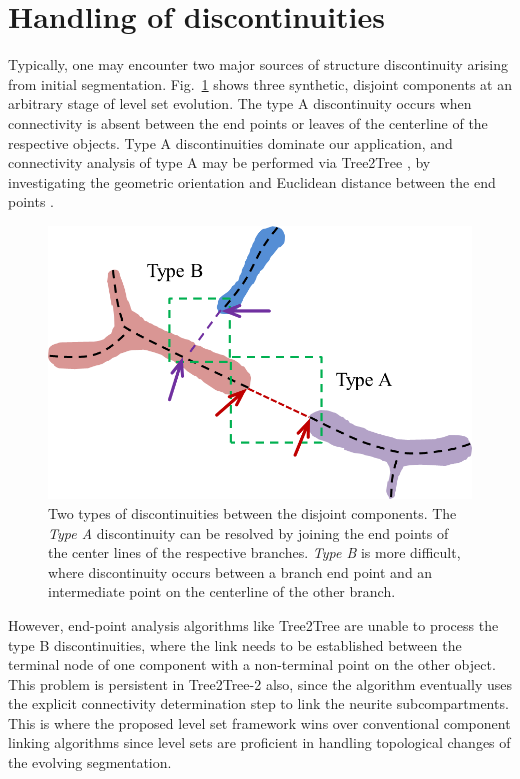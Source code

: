 \section{Handling of discontinuities}
Typically, one may encounter two major sources of structure discontinuity arising from initial segmentation. Fig.~\ref{fig:disc_types} shows three synthetic, disjoint components at an arbitrary stage of level set evolution. The type A discontinuity occurs when connectivity is absent between the end points or leaves of the centerline of the respective objects. Type A discontinuities dominate our application, and connectivity analysis of type A  may be performed via Tree2Tree \cite{basu_T2T_journal}, by investigating the geometric orientation and Euclidean distance between the end points . 
\begin{figure}[t]
\centering
\includegraphics[width=.6\textwidth]{./images/TuFF/attr_force/discontinuities}
\caption[Type A and Type B discontinuities]{Two types of discontinuities between the disjoint components. The \emph{Type A} discontinuity can be resolved by joining the end points of the center lines of the respective branches. \emph{Type B} is more difficult, where discontinuity occurs between a branch end point and an intermediate point on the centerline of the other branch.}
\label{fig:disc_types}
\end{figure}
However, end-point analysis algorithms like Tree2Tree are unable to process the type B discontinuities, where the link needs to be established between the terminal node of one component with a non-terminal point on the other object. This problem is persistent in Tree2Tree-2 also, since the algorithm eventually uses the explicit connectivity determination step to link the neurite subcompartments.
This is where the proposed level set framework wins over conventional component linking algorithms since level sets are proficient in handling topological changes of the evolving segmentation.


